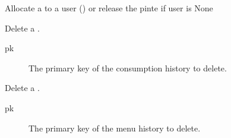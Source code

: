 \documentclass[letterpaper,10pt,english]{sphinxmanual}
\begin{document}

\begin{fulllineitems}
\label{\detokenize{modules/views:gestion.views.allocate}}
Allocate a {\hyperref[\detokenize{modules/models:gestion.models.Pinte}]{}} to a user () or release the pinte if user is None

\end{fulllineitems}


\begin{fulllineitems}
\label{\detokenize{modules/views:gestion.views.cancel_consumption}}
Delete a {\hyperref[\detokenize{modules/models:gestion.models.ConsumptionHistory}]{}}.
\begin{description}
\item[{pk}] \leavevmode
The primary key of the consumption history to delete.

\end{description}

\end{fulllineitems}


\begin{fulllineitems}
\label{\detokenize{modules/views:gestion.views.cancel_menu}}
Delete a {\hyperref[\detokenize{modules/models:gestion.models.MenuHistory}]{}}.
\begin{description}
\item[{pk}] \leavevmode
The primary key of the menu history to delete.

\end{description}

\end{fulllineitems}
\end{document}
